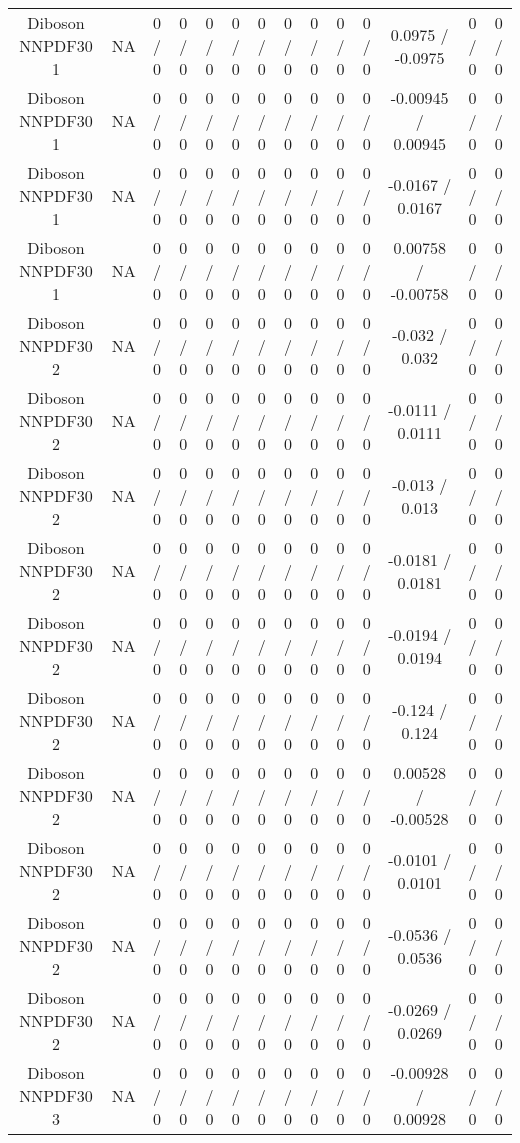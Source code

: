 \documentclass[10pt]{article}
\begin{document}
\begin{table}[htbp]
\begin{center}
\begin{tabular}{|c|c|c|c|c|c|c|c|c|c|c|c|c|c|}
  Diboson NNPDF30 1 &    NA    & 0 / 0 & 0 / 0 & 0 / 0 & 0 / 0 & 0 / 0 & 0 / 0 & 0 / 0 & 0 / 0 & 0 / 0 & 0.0975 / -0.0975 & 0 / 0 & 0 / 0 \\ 
  Diboson NNPDF30 1 &    NA    & 0 / 0 & 0 / 0 & 0 / 0 & 0 / 0 & 0 / 0 & 0 / 0 & 0 / 0 & 0 / 0 & 0 / 0 & -0.00945 / 0.00945 & 0 / 0 & 0 / 0 \\ 
  Diboson NNPDF30 1 &    NA    & 0 / 0 & 0 / 0 & 0 / 0 & 0 / 0 & 0 / 0 & 0 / 0 & 0 / 0 & 0 / 0 & 0 / 0 & -0.0167 / 0.0167 & 0 / 0 & 0 / 0 \\ 
  Diboson NNPDF30 1 &    NA    & 0 / 0 & 0 / 0 & 0 / 0 & 0 / 0 & 0 / 0 & 0 / 0 & 0 / 0 & 0 / 0 & 0 / 0 & 0.00758 / -0.00758 & 0 / 0 & 0 / 0 \\ 
  Diboson NNPDF30 2 &    NA    & 0 / 0 & 0 / 0 & 0 / 0 & 0 / 0 & 0 / 0 & 0 / 0 & 0 / 0 & 0 / 0 & 0 / 0 & -0.032 / 0.032 & 0 / 0 & 0 / 0 \\ 
  Diboson NNPDF30 2 &    NA    & 0 / 0 & 0 / 0 & 0 / 0 & 0 / 0 & 0 / 0 & 0 / 0 & 0 / 0 & 0 / 0 & 0 / 0 & -0.0111 / 0.0111 & 0 / 0 & 0 / 0 \\ 
  Diboson NNPDF30 2 &    NA    & 0 / 0 & 0 / 0 & 0 / 0 & 0 / 0 & 0 / 0 & 0 / 0 & 0 / 0 & 0 / 0 & 0 / 0 & -0.013 / 0.013 & 0 / 0 & 0 / 0 \\ 
  Diboson NNPDF30 2 &    NA    & 0 / 0 & 0 / 0 & 0 / 0 & 0 / 0 & 0 / 0 & 0 / 0 & 0 / 0 & 0 / 0 & 0 / 0 & -0.0181 / 0.0181 & 0 / 0 & 0 / 0 \\ 
  Diboson NNPDF30 2 &    NA    & 0 / 0 & 0 / 0 & 0 / 0 & 0 / 0 & 0 / 0 & 0 / 0 & 0 / 0 & 0 / 0 & 0 / 0 & -0.0194 / 0.0194 & 0 / 0 & 0 / 0 \\ 
  Diboson NNPDF30 2 &    NA    & 0 / 0 & 0 / 0 & 0 / 0 & 0 / 0 & 0 / 0 & 0 / 0 & 0 / 0 & 0 / 0 & 0 / 0 & -0.124 / 0.124 & 0 / 0 & 0 / 0 \\ 
  Diboson NNPDF30 2 &    NA    & 0 / 0 & 0 / 0 & 0 / 0 & 0 / 0 & 0 / 0 & 0 / 0 & 0 / 0 & 0 / 0 & 0 / 0 & 0.00528 / -0.00528 & 0 / 0 & 0 / 0 \\ 
  Diboson NNPDF30 2 &    NA    & 0 / 0 & 0 / 0 & 0 / 0 & 0 / 0 & 0 / 0 & 0 / 0 & 0 / 0 & 0 / 0 & 0 / 0 & -0.0101 / 0.0101 & 0 / 0 & 0 / 0 \\ 
  Diboson NNPDF30 2 &    NA    & 0 / 0 & 0 / 0 & 0 / 0 & 0 / 0 & 0 / 0 & 0 / 0 & 0 / 0 & 0 / 0 & 0 / 0 & -0.0536 / 0.0536 & 0 / 0 & 0 / 0 \\ 
  Diboson NNPDF30 2 &    NA    & 0 / 0 & 0 / 0 & 0 / 0 & 0 / 0 & 0 / 0 & 0 / 0 & 0 / 0 & 0 / 0 & 0 / 0 & -0.0269 / 0.0269 & 0 / 0 & 0 / 0 \\ 
  Diboson NNPDF30 3 &    NA    & 0 / 0 & 0 / 0 & 0 / 0 & 0 / 0 & 0 / 0 & 0 / 0 & 0 / 0 & 0 / 0 & 0 / 0 & -0.00928 / 0.00928 & 0 / 0 & 0 / 0 \\ 

\end{tabular}
\end{center}
\end{table}
\end{document}
